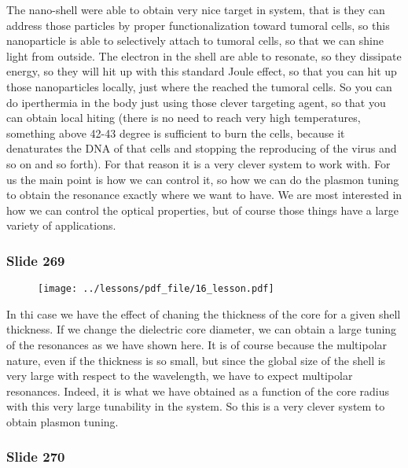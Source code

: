 \documentclass[../main/main.tex]{subfiles}
\begin{document}
The nano-shell were able to obtain very nice target in system, that is they can address those particles by proper functionalization toward tumoral cells, so this nanoparticle is able to selectively attach to tumoral cells, so that we can shine light from outside. The electron in the shell are able to resonate, so they dissipate energy, so they will hit up with this standard Joule effect, so that you can hit up those nanoparticles locally, just where the reached the tumoral cells. So you can do iperthermia in the body just using those clever targeting agent, so that you can obtain local hiting (there is no need to reach very high temperatures, something above 42-43 degree is sufficient to burn the cells, because it denaturates the DNA of that cells and stopping the reproducing of the virus and so on and so forth). For that reason it is a very clever system to work with. For us the main point is how we can control it, so how we can do the plasmon tuning to obtain the resonance exactly where we want to have. We are most interested in how we can control the optical properties, but of course those things have a large variety of applications.

\newpage

\subsubsection{Slide 269}

\begin{figure}[h!]
\centering
\texttt{[image: ../lessons/pdf\_file/16\_lesson.pdf]}
\end{figure}

In thi case we have the effect of chaning the thickness of the core for a given shell thickness. If we change the dielectric core diameter, we can obtain a large tuning of the resonances as we have shown here. It is of course because the multipolar nature, even if the thickness is so small, but since the global size of the shell is very large with respect to the wavelength, we have to expect multipolar resonances. Indeed, it is what we have obtained as a function of the core radius with this very large tunability in the system.
So this is  a very clever system to obtain plasmon tuning.

\newpage

\subsubsection{Slide 270}
\end{document}
